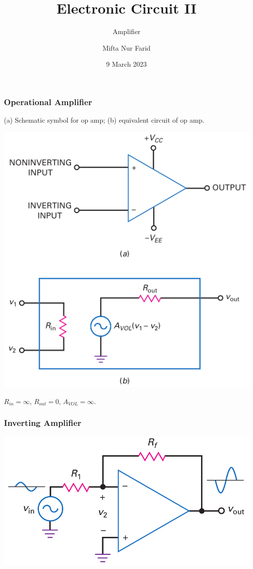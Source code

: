 \documentclass[pdflatex,compress]{beamer}
\title{Electronic Circuit II}
\subtitle{Amplifier}
\author{Mifta Nur Farid}
\date{9 March 2023}
\begin{document}
\maketitle

\begin{frame}
	\frametitle{Operational Amplifier}
	(a) Schematic symbol for op amp; (b) equivalent circuit of op amp. 
	\begin{center}
		\includegraphics[width=0.4\linewidth]{img/fig1602}
	\end{center}
	$R_{in} = \infty$, $R_{out} = 0$, $A_{VOL} = \infty$.
\end{frame}

\begin{frame}
	\frametitle{Inverting Amplifier}
	\begin{center}
		\includegraphics[width=0.7\linewidth]{img/fig1612}
	\end{center}
\end{frame}
\end{document}
